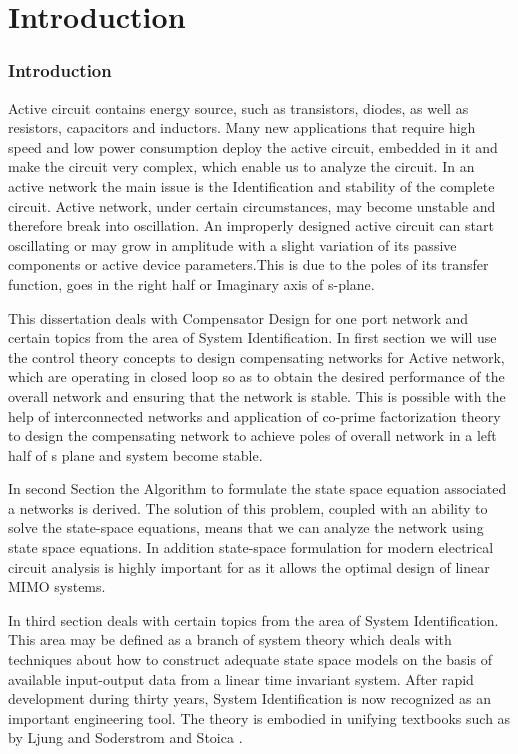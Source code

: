 \chapter{\Large{Introduction}} \label{code}
\subsection{Introduction}

Active circuit contains energy source, such as transistors, diodes, as well as resistors, capacitors and inductors. Many new applications that require high speed and low power consumption deploy the active circuit, embedded in it and make the circuit very complex, which enable us to analyze the circuit. In an active network the main issue is the Identification and stability of the complete circuit. Active network, under certain circumstances, may become unstable and therefore break into oscillation. An improperly designed active circuit can start oscillating or may grow in amplitude with a slight variation of its passive components or active device parameters.This is due to the poles of its transfer function, goes in the right half or Imaginary axis of s-plane.

This dissertation deals with Compensator Design for one port network and certain topics from the area of System Identification. In first section we will use the control theory concepts to design compensating networks for Active network, which are operating in closed loop so as to obtain the desired performance of the overall network and ensuring that the network is stable. This is possible with the help of interconnected networks and application of co-prime factorization theory to design the compensating network to achieve poles of overall network in a left half of s plane and system become stable.

In second Section the Algorithm to formulate the state space equation associated a networks is derived. The solution of this problem, coupled with an ability to solve the state-space equations, means that we can analyze the network using state space equations. In addition state-space formulation for modern electrical circuit analysis is highly important for as it allows the optimal design of linear MIMO systems.

In third section deals with certain topics from the area of System Identification. This area may be defined as a branch of system theory which deals with techniques about how to construct adequate state space models on the basis of available input-output data from a linear time invariant system. After rapid development during thirty years, System Identification is now recognized as an important engineering tool. The theory is embodied in unifying textbooks such as by Ljung \cite{Ljung} and Soderstrom and Stoica \cite{Soder}.

